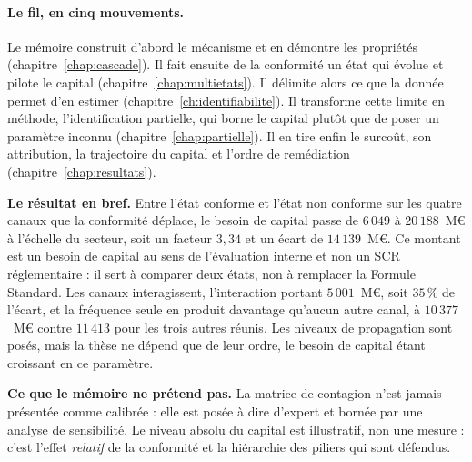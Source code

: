 \paragraph{Le fil, en cinq mouvements.} Le mémoire construit d'abord le mécanisme et en démontre
les propriétés (chapitre~\ref{chap:cascade}). Il fait ensuite de la conformité un état qui évolue
et pilote le capital (chapitre~\ref{chap:multietats}). Il délimite alors ce que la donnée permet
d'en estimer (chapitre~\ref{ch:identifiabilite}). Il transforme cette limite en méthode,
l'identification partielle, qui borne le capital plutôt que de poser un paramètre inconnu
(chapitre~\ref{chap:partielle}). Il en tire enfin le surcoût, son attribution, la trajectoire du
capital et l'ordre de remédiation (chapitre~\ref{chap:resultats}).

\begin{cle}
\textbf{Le résultat en bref.} Entre l'état conforme et l'état non conforme sur les quatre canaux
que la conformité déplace, le besoin de capital passe de $6\,049$ à $20\,188$~M\euro{} à
l'échelle du secteur, soit un facteur $3{,}34$ et un écart de $14\,139$~M\euro{}. Ce montant est
un besoin de capital au sens de l'évaluation interne et non un SCR réglementaire : il sert à
comparer deux états, non à remplacer la Formule Standard. Les canaux interagissent, l'interaction
portant $5\,001$~M\euro{}, soit $35\,\%$ de l'écart, et la fréquence seule en produit davantage
qu'aucun autre canal, à $10\,377$~M\euro{} contre $11\,413$ pour les trois autres réunis. Les
niveaux de propagation sont posés, mais la thèse ne dépend que de leur ordre, le besoin de
capital étant croissant en ce paramètre.
\end{cle}

\begin{attention}
\textbf{Ce que le mémoire ne prétend pas.} La matrice de contagion n'est jamais présentée comme
calibrée : elle est posée à dire d'expert et bornée par une analyse de sensibilité. Le niveau
absolu du capital est illustratif, non une mesure : c'est l'effet \emph{relatif} de la conformité
et la hiérarchie des piliers qui sont défendus.
\end{attention}
